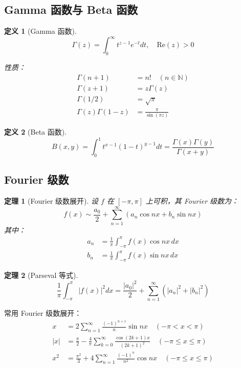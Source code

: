 \documentclass[12pt]{article}
\newtheorem{theorem}{定理}[section]
\newtheorem{definition}{定义}[section]
\begin{document}
\subsection{Gamma 函数与 Beta 函数}

\begin{definition}[Gamma 函数]
$$\Gamma(z) = \int_0^{\infty} t^{z-1} e^{-t} dt, \quad \text{Re}(z) > 0$$

性质：
\begin{align}
\Gamma(n+1) &= n! \quad (n \in \mathbb{N}) \\
\Gamma(z+1) &= z\Gamma(z) \\
\Gamma(1/2) &= \sqrt{\pi} \\
\Gamma(z)\Gamma(1-z) &= \frac{\pi}{\sin(\pi z)}
\end{align}
\end{definition}

\begin{definition}[Beta 函数]
$$B(x, y) = \int_0^1 t^{x-1}(1-t)^{y-1} dt = \frac{\Gamma(x)\Gamma(y)}{\Gamma(x+y)}$$
\end{definition}

\subsection{Fourier 级数}

\begin{theorem}[Fourier 级数展开]
设 $f$ 在 $[-\pi, \pi]$ 上可积，其 Fourier 级数为：
$$f(x) \sim \frac{a_0}{2} + \sum_{n=1}^{\infty} (a_n \cos nx + b_n \sin nx)$$
其中：
\begin{align}
a_n &= \frac{1}{\pi} \int_{-\pi}^{\pi} f(x) \cos nx \, dx \\
b_n &= \frac{1}{\pi} \int_{-\pi}^{\pi} f(x) \sin nx \, dx
\end{align}
\end{theorem}

\begin{theorem}[Parseval 等式]
$$\frac{1}{\pi} \int_{-\pi}^{\pi} |f(x)|^2 dx = \frac{|a_0|^2}{2} + \sum_{n=1}^{\infty} (|a_n|^2 + |b_n|^2)$$
\end{theorem}

常用 Fourier 级数展开：
\begin{align}
x &= 2\sum_{n=1}^{\infty} \frac{(-1)^{n+1}}{n} \sin nx \quad (-\pi < x < \pi) \\
|x| &= \frac{\pi}{2} - \frac{4}{\pi}\sum_{k=0}^{\infty} \frac{\cos(2k+1)x}{(2k+1)^2} \quad (-\pi \leq x \leq \pi) \\
x^2 &= \frac{\pi^2}{3} + 4\sum_{n=1}^{\infty} \frac{(-1)^n}{n^2} \cos nx \quad (-\pi \leq x \leq \pi)
\end{align}
\end{document}
